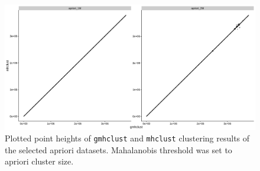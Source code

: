 \begin{figure}\centering
	\includegraphics[width=\linewidth]{img/apriori_result}
	\caption{Plotted point heights of \texttt{gmhclust} and \texttt{mhclust} clustering results of the selected apriori datasets. Mahalanobis threshold was set to apriori cluster size.}
	\label{fig04:apriori_result}
\end{figure}

